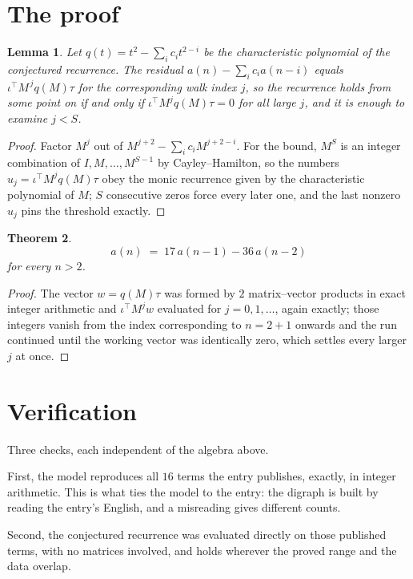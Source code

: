 \documentclass[11pt,a4paper]{article}
\theoremstyle{plain}
\newtheorem{theorem}{Theorem}
\newtheorem{lemma}[theorem]{Lemma}
\theoremstyle{definition}
\begin{document}
\section{The proof}

\begin{lemma}\label{lem:crit}
Let $q(t)=t^{2}-\sum_i c_it^{2-i}$ be the characteristic polynomial of the
conjectured recurrence. The residual $a(n)-\sum_ic_ia(n-i)$ equals
$\iota^{\!\top}M^{\,j}q(M)\tau$ for the corresponding walk index $j$, so the recurrence
holds from some point on if and only if $\iota^{\!\top}M^{j}q(M)\tau=0$ for all large $j$,
and it is enough to examine $j<S$.
\end{lemma}

\begin{proof}
Factor $M^{j}$ out of $M^{j+2}-\sum_ic_iM^{j+2-i}$. For the bound, $M^{S}$
is an integer combination of $I,M,\dots,M^{S-1}$ by Cayley--Hamilton, so the numbers
$u_j=\iota^{\!\top}M^{j}q(M)\tau$ obey the monic recurrence given by the characteristic
polynomial of $M$; $S$ consecutive zeros force every later one, and the last nonzero $u_j$
pins the threshold exactly.
\end{proof}

\begin{theorem}
\[
a(n)\;=\;17\,a(n-1) - 36\,a(n-2)
\]
for every $n>2$.
\end{theorem}

\begin{proof}
The vector $w=q(M)\tau$ was formed by $2$ matrix--vector products in exact integer
arithmetic and $\iota^{\!\top}M^{j}w$ evaluated for $j=0,1,\dots$, again exactly; those
integers vanish from the index corresponding to $n=2+1$ onwards and the run continued
until the working vector was identically zero, which settles every larger $j$ at once.
\end{proof}

\section{Verification}

Three checks, each independent of the algebra above.

First, the model reproduces all $16$ terms the entry publishes, exactly, in integer
arithmetic. This is what ties the model to the entry: the digraph is built by reading the
entry's English, and a misreading gives different counts.

Second, the conjectured recurrence was evaluated directly on those published terms, with no
matrices involved, and holds wherever the proved range and the data overlap.
\end{document}
